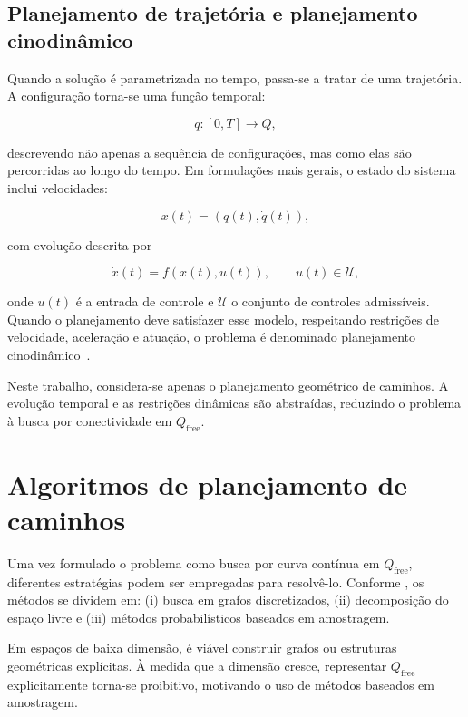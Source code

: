 \subsection*{Planejamento de trajetória e planejamento cinodinâmico}

Quando a solução é parametrizada no tempo, passa-se a tratar de uma trajetória. A configuração torna-se uma função temporal:

\begin{equation}
    q : [0,T] \rightarrow Q,
\end{equation}

descrevendo não apenas a sequência de configurações, mas como elas são percorridas ao longo do tempo. Em formulações mais gerais, o estado do sistema inclui velocidades:

\begin{equation}
    x(t) = (q(t), \dot{q}(t)),
\end{equation}

com evolução descrita por

\begin{equation}
    \dot{x}(t) = f(x(t), u(t)), \qquad u(t) \in \mathcal{U},
    \label{eq:system_dynamics}
\end{equation}

onde $u(t)$ é a entrada de controle e $\mathcal{U}$ o conjunto de controles admissíveis. Quando o planejamento deve satisfazer esse modelo, respeitando restrições de velocidade, aceleração e atuação, o problema é denominado planejamento cinodinâmico~\cite{LaValle1999RandomizedKP}.

Neste trabalho, considera-se apenas o planejamento geométrico de caminhos. A evolução temporal e as restrições dinâmicas são abstraídas, reduzindo o problema à busca por conectividade em $Q_{\mathrm{free}}$.

\section{Algoritmos de planejamento de caminhos}
\label{sec:algoritmos}

Uma vez formulado o problema como busca por curva contínua em $Q_{\mathrm{free}}$, diferentes estratégias podem ser empregadas para resolvê-lo. Conforme \citet{choset2005principles}, os métodos se dividem em: (i) busca em grafos discretizados, (ii) decomposição do espaço livre e (iii) métodos probabilísticos baseados em amostragem.

Em espaços de baixa dimensão, é viável construir grafos ou estruturas geométricas explícitas. À medida que a dimensão cresce, representar $Q_{\mathrm{free}}$ explicitamente torna-se proibitivo, motivando o uso de métodos baseados em amostragem.

